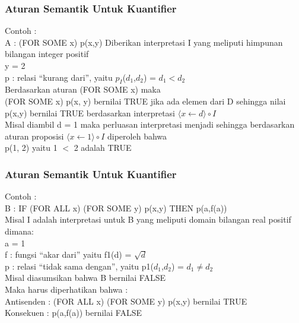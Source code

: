 \documentclass[handout]{beamer}
\theoremstyle{definition}
\theoremstyle{example}
\begin{document}
\begin{frame}
	\frametitle{Aturan Semantik Untuk Kuantifier}
	Contoh :\\
	A : (FOR SOME x) p(x,y)
	Diberikan interpretasi I yang meliputi himpunan bilangan integer positif\\ 
	y = 2\\
	p : relasi “kurang dari”, yaitu $p_I$($d_1$,$d_2$) = $d_1<d_2$\\
	\vspace{5mm}	
	Berdasarkan aturan (FOR SOME x) maka\\
	(FOR SOME x) p(x, y) bernilai TRUE jika ada elemen dari D sehingga nilai p(x,y) bernilai TRUE berdasarkan interpretasi $\langle x \leftarrow d \rangle \circ I $\\
	\vspace{5mm}	
	Misal diambil d = 1 maka perluasan interpretasi menjadi sehingga berdasarkan aturan proposisi $\langle x \leftarrow 1 \rangle \circ I $ diperoleh bahwa\\
	p(1, 2) yaitu 1 $<$ 2 adalah TRUE		
\end{frame}

\begin{frame}
	\frametitle{Aturan Semantik Untuk Kuantifier}
	Contoh :\\
	B : IF (FOR ALL x) (FOR SOME y) p(x,y) THEN p(a,f(a))\\
	\vspace{5mm}
	 Misal I adalah interpretasi untuk B yang meliputi domain bilangan real positif dimana:\\
	 a = 1\\
	 f : fungsi “akar dari” yaitu f1(d) = $\sqrt{d}$\\
	 p : relasi “tidak sama dengan”, yaitu p1($d_1$,$d_2$) = $d_1 \neq d_2$\\
	 \vspace{5mm}
	 Misal diasumsikan bahwa B bernilai FALSE\\
	 Maka harus diperhatikan bahwa :\\ Antisenden : (FOR ALL x) (FOR SOME y) p(x,y) bernilai TRUE\\
	 Konsekuen : p(a,f(a)) bernilai FALSE
\end{frame}
\end{document}
